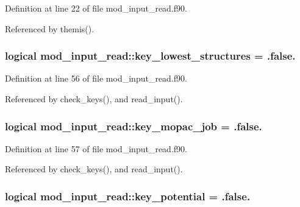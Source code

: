 Definition at line 22 of file mod\+\_\+input\+\_\+read.\+f90.



Referenced by themis().

\subsubsection[{\texorpdfstring{key\+\_\+lowest\+\_\+structures}{key_lowest_structures}}]{\setlength{\rightskip}{0pt plus 5cm}logical mod\+\_\+input\+\_\+read\+::key\+\_\+lowest\+\_\+structures = .false.}\hypertarget{namespacemod__input__read_a1f5f9ac3d207b274fa7eab7f06a7d472}{}\label{namespacemod__input__read_a1f5f9ac3d207b274fa7eab7f06a7d472}


Definition at line 56 of file mod\+\_\+input\+\_\+read.\+f90.



Referenced by check\+\_\+keys(), and read\+\_\+input().

\subsubsection[{\texorpdfstring{key\+\_\+mopac\+\_\+job}{key_mopac_job}}]{\setlength{\rightskip}{0pt plus 5cm}logical mod\+\_\+input\+\_\+read\+::key\+\_\+mopac\+\_\+job = .false.}\hypertarget{namespacemod__input__read_a273dcae5fbe1ea83ebf236f85d931560}{}\label{namespacemod__input__read_a273dcae5fbe1ea83ebf236f85d931560}


Definition at line 57 of file mod\+\_\+input\+\_\+read.\+f90.



Referenced by check\+\_\+keys(), and read\+\_\+input().

\subsubsection[{\texorpdfstring{key\+\_\+potential}{key_potential}}]{\setlength{\rightskip}{0pt plus 5cm}logical mod\+\_\+input\+\_\+read\+::key\+\_\+potential = .false.}\hypertarget{namespacemod__input__read_a9227a15f259c9085a4a610eedbcf070c}{}\label{namespacemod__input__read_a9227a15f259c9085a4a610eedbcf070c}


